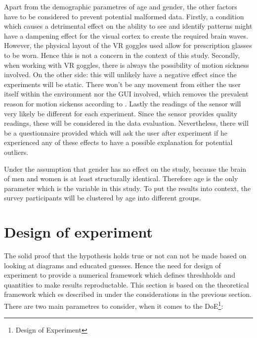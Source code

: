 
            Apart from the demographic parametres of age and gender, the other factors have to be considered to prevent potential malformed data. Firstly, a condition which causes a detrimental effect on the ability to see and identify patterns might have a dampening effect for the visual cortex to create the required brain waves. However, the physical layout of the VR goggles used allow for prescription glasses to be worn. Hence this is not a concern in the context of this study. Secondly, when working with VR goggles, there is always the possibility of motion sickness involved. On the other side: this will unlikely have a negative effect since the experiments will be static. There won't be any movement from either the user itself within the environment nor the GUI involved, which removes the prevalent reason for motion sickenss according to \cite{Golding.2006}.
            Lastly the readings of the sensor will very likely be different for each experiment. Since the sensor provides quality readings, these will be considered in the data evaluation. Nevertheless, there will be a questionnaire provided which will ask the user after experiment if he experienced any of these effects to have a possible explanation for potential outliers.

            \medskip

            Under the assumption that gender has no effect on the study, because the brain of men and women is at least structurally identical. Therefore age is the only parameter which is the variable in this study. To put the results into context, the survey participants will be clustered by age into different groups.

        \section{Design of experiment}\label{doe}

            The solid proof that the hypothesis holds true or not can not be made based on looking at diagrams and educated guesses. Hence the need for design of experiment to provide a numerical framework which defines threshholds and quantities to make results reproductable. This section is based on the theoretical framework which es described in \cite[87ff]{Siebertz.2017} under the considerations in the previous section.
            There are two main parametres to consider, when it comes to the DoE\footnote{Design of Experiment}: 
            
